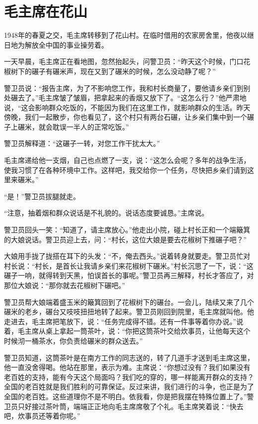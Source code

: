 \documentclass[12pt,UTF-8,openany]{ctexbook}
\begin{document}
\chapter{毛主席在花山}

\begin{Large}
    
    1948年的春夏之交，毛主席转移到了花山村。在临时借用的农家房舍里，他夜以继日地为解放全中国的事业操劳着。
    
    一天早晨，毛主席正在看地图，忽然抬起头，问警卫员：“昨天这个时候，门口花椒树下的碾子有碾米声，现在又到了碾米的时候，怎么没动静了呢？”
    
    警卫员说：“报告主席，为了不影响您工作，我和村长商量了，要他请乡亲们到别处碾去了。”毛主席皱了皱眉，把拿起来的香烟又放下了。“这怎么行？”他严肃地说，“这会影响群众吃饭的，不能因为我们在这里工作，就影响群众的生活。昨天傍晚，我们一起散步，你也看见了，这个村只有两台石碾，让乡亲们集中到一个碾子上碾米，就会耽误一半人的正常吃饭。”
    
    警卫员解释道：“这碾子一转，对您工作干扰太大。”
    
    毛主席递给他一支烟，自己也点燃了一支，说：“这怎么会呢？多年的战争生活，使我习惯了在各种环境中工作。这样吧，我交给你一个任务，尽快把乡亲们请到这里来碾米。”
    
    “是！”警卫员拔腿就走。
    
    “注意，抽着烟和群众说话是不礼貌的。说话态度要诚恳。”主席说。
    
    警卫员回头一笑：“知道了，请主席放心。”他走出小院，碰上村长正和一个端簸箕的大娘说话。警卫员迎上去，问：“村长，这位大娘是要去花椒树下推碾子吧？”
    
    大娘用手拢了拢搭在耳下的头发：“不，俺去西头。”说着转身就要走。警卫员忙对村长说：“村长，是首长让我请乡亲们来花椒树下碾米。”村长沉思了一下，说：“这碾子一响，就得转到天黑，怕误首长的事呢。”警卫员再三解释，村长才答应了，对那位大娘说：“那你就去花椒树下碾吧。”
    
    警卫员帮大娘端着盛玉米的簸箕回到了花椒树下的碾台。一会儿，陆续又来了几个碾米的老乡，碾台又吱吱扭扭地转了起来。警卫员刚回到院里，毛主席就叫他。他走进去，毛主席把笔放下，说：“任务完成得不错。还有一件事等着你办说。”说着，毛主席从桌上拿起一筒茶叶，说：“你把这筒茶叶交给炊事员，让他每天这个时候沏一桶茶水，你负责给碾米的群众送去。”
    
    警卫员知道，这筒茶叶是在南方工作的同志送的，转了几道手才送到毛主席这里，他一直没舍得喝。他站在那里，表示为难。主席说：“你想过没有？我们如果没有老百姓的支持，能有今天这个局面吗？我们吃的穿的，哪一样能离开群众的支持？全国的老百姓就是我们胜利的可靠保证。反过来讲，我们进行的斗争，也正是为了全国的老百姓。这些道理你不是不明白。依我看，你是把我摆在特殊位置上了。”警卫员只好接过茶叶筒，端端正正地向毛主席席敬了个礼。毛主席笑着说：“快去吧，炊事员还等着你呢。”
    

\end{Large}
\end{document}
